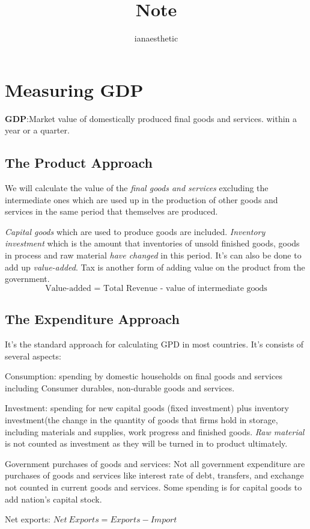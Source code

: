 \documentclass[10pt, a4paper]{article}
\title{Note}
\author{ianaesthetic}
\begin{document}
    \section{Measuring GDP}
        \textbf{GDP}:Market value of domestically produced final goods and services. within a year or a quarter.
        \subsection{The Product Approach}
            We will calculate the value of the \emph{final goods and services} excluding the intermediate ones which are used up in the production of other goods and services in the same period that themselves are produced. 
            
            \emph{Capital goods} which are used to produce goods are included. \emph{Inventory investment} which is the amount that inventories of unsold finished goods, goods in process and raw material \emph{have changed} in this period. It's can also be done to add up \emph{value-added}. Tax is another form of adding value on the product from the government. 
            $$
                \text{Value-added = Total\ Revenue - value\ of\ intermediate\ goods}
            $$

        \subsection{The Expenditure Approach}
            It's the standard approach for calculating GPD in most countries. It's consists of several aspects: 

                Consumption: spending by domestic households on final goods and services including Consumer durables, non-durable goods and services. 
                
                Investment: spending for new capital goods (fixed investment) plus inventory investment(the change in the quantity of goods that firms hold in storage, including materials and supplies, work progress and finished goods. \emph{Raw material} is not counted as investment as they will be turned in to product ultimately.
                
                Government purchases of goods and services: Not all government expenditure are purchases of goods and services like interest rate of debt, transfers, and exchange not counted in current goods and services. Some spending is for capital goods to add nation's capital stock.

                Net exports: $Net\ Exports = Exports - Import$
\end{document}

